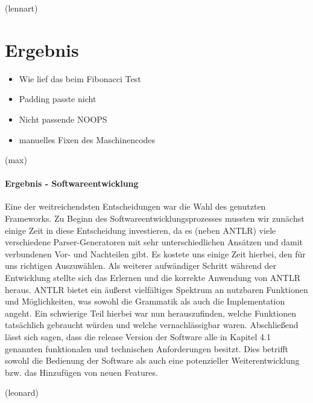 \documentclass[paper=a4,fontsize=12pt,twocolumn]{scrreprt}
\begin{document}
(lennart)

\chapter{Ergebnis}




\begin{itemize}
    \item Wie lief das beim Fibonacci Test
    \item Padding passte nicht
    \item Nicht passende NOOPS
    \item manuelles Fixen des Maschinencodes
\end{itemize}



(max)

\subsubsection{Ergebnis - Softwareentwicklung}
Eine der weitreichendsten Entscheidungen war die Wahl des genutzten Frameworks.
Zu Beginn des Softwareentwicklungsprozesses mussten wir zunächst einige Zeit in diese Entscheidung investieren, da es (neben ANTLR) viele verschiedene Parser-Generatoren mit sehr unterschiedlichen Ansätzen und damit verbundenen Vor- und Nachteilen gibt.
Es kostete uns einige Zeit hierbei, den für uns richtigen Auszuwählen.
Als weiterer aufwändiger Schritt während der Entwicklung stellte sich das Erlernen und die korrekte Anwendung von ANTLR heraus.
ANTLR bietet ein äußerst vielfältiges Spektrum an nutzbaren Funktionen und Möglichkeiten, was sowohl die Grammatik als auch die Implementation angeht.
Ein schwierige Teil hierbei war nun herauszufinden, welche Funktionen tatsächlich gebraucht würden und welche vernachlässigbar waren.
Abschließend lässt sich sagen, dass die release Version der Software alle in Kapitel 4.1
genannten funktionalen und technischen Anforderungen besitzt.
Dies betrifft sowohl die Bedienung  der Software als auch eine potenzieller Weiterentwicklung bzw. das Hinzufügen von neuen Features. 

(leonard)
\end{document}
